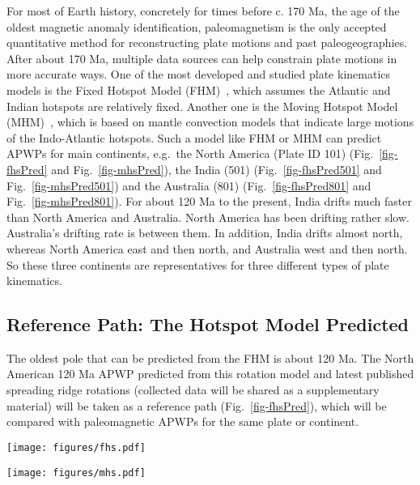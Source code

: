 For most of Earth history, concretely for times before c. 170 Ma, the age of the
oldest magnetic anomaly identification, paleomagnetism is the only accepted
quantitative method for reconstructing plate motions and past paleogeographies.
After about 170 Ma, multiple data sources can help constrain plate motions in
more accurate ways. One of the most developed and studied plate kinematics
models is the Fixed Hotspot Model (FHM)~\cite{M93,M99}, which assumes the
Atlantic and Indian hotspots are relatively fixed. Another one is the Moving
Hotspot Model (MHM)~\cite{O05}, which is based on mantle convection models that
indicate large motions of the Indo-Atlantic hotspots. Such a model like FHM or
MHM can predict APWPs for main continents, e.g.\ the North America (Plate ID
101) (Fig.~\ref{fig-fhsPred} and Fig.~\ref{fig-mhsPred}), the India (501)
(Fig.~\ref{fig-fhsPred501} and Fig.~\ref{fig-mhsPred501}) and the Australia
(801) (Fig.~\ref{fig-fhsPred801} and Fig.~\ref{fig-mhsPred801}). For about 120
Ma to the present, India drifts much faster than North America and Australia.
North America has been drifting rather slow. Australia's drifting rate is
between them. In addition, India drifts almost north, whereas North America
east and then north, and Australia west and then north. So these three
continents are representatives for three different types of plate kinematics.

\subsection{Reference Path: The Hotspot Model Predicted}

The oldest pole that can be predicted from the FHM is about 120 Ma. The North
American 120 Ma APWP predicted from this rotation model and
latest published spreading ridge rotations (collected data will be shared as a
supplementary material) will be taken as a reference path
(Fig.~\ref{fig-fhsPred}), which will be compared with paleomagnetic APWPs for
the same plate or continent.

\begin{figure*}
\centering
\texttt{[image: figures/fhs.pdf]}
\caption[120 Ma FHM predicted APWP of North America]{FHM
predicted 120 Ma APWP for $NAC$ through the North
America\textendash{}Nubia\textendash{}Mantle plate circuit. Its age step is 5
Myr.}\label{fig-fhsPred}
\end{figure*}

\begin{figure*}
\centering
\texttt{[image: figures/mhs.pdf]}
\caption[120 Ma MHM predicted APWP of North America]{MHM
predicted 120 Ma APWP for $NAC$ through the North
America\textendash{}Nubia\textendash{}Mantle plate circuit. Its age step is 5
Myr. The dashed line is the FHM predicted path shown in
Fig.~\ref{fig-fhsPred}.}\label{fig-mhsPred}
\end{figure*}


